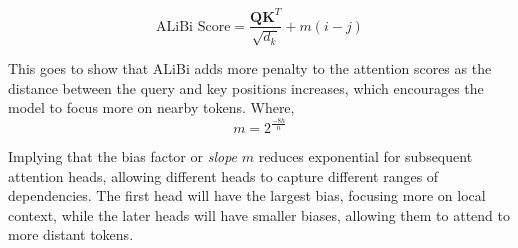 \documentclass[10pt]{article}
\theoremstyle{plain}
\begin{document}
\[
    \text{ALiBi Score} = \frac{\mathbf{Q} \mathbf{K} ^T}{\sqrt{d_k}} + m (i - j)
\]

This goes to show that ALiBi adds more penalty to the attention scores as the distance between the query and key positions increases, which encourages the model to focus more on nearby tokens. Where,
\[
    m = 2^{\frac{-8h}{n}}
\]
 
Implying that the bias factor or \emph{slope} \(m\) reduces exponential for subsequent attention heads, allowing different heads to capture different ranges of dependencies. The first head will have the largest bias, focusing more on local context, while the later heads will have smaller biases, allowing them to attend to more distant tokens.

\end{document}
